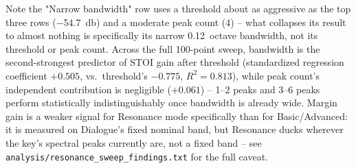 \begin{table}[h]
\par\vspace{4pt}
\raggedright\footnotesize Note the "Narrow bandwidth" row uses a threshold
about as aggressive as the top three rows (\SI{-54.7}{\decibel}) and a
moderate peak count (4) -- what collapses its result to almost nothing is
specifically its narrow \SI{0.12}{octave} bandwidth, not its threshold or
peak count. Across the full 100-point sweep, bandwidth is the
second-strongest predictor of STOI gain after threshold (standardized
regression coefficient $+0.505$, vs.\ threshold's $-0.775$, $R^2=0.813$),
while peak count's independent contribution is negligible ($+0.061$) --
1--2 peaks and 3--6 peaks perform statistically indistinguishably once
bandwidth is already wide. Margin gain is a weaker signal for Resonance
mode specifically than for Basic/Advanced: it is measured on Dialogue's
fixed nominal band, but Resonance ducks wherever the key's spectral peaks
currently are, not a fixed band -- see
\texttt{analysis/resonance\_sweep\_findings.txt} for the full caveat.
\end{table}


